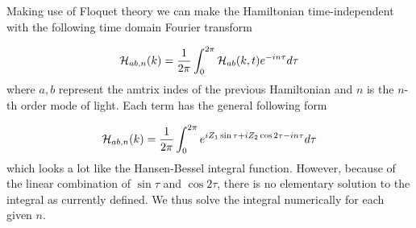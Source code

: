 Making use of Floquet theory we can make the Hamiltonian time-independent with the following time domain Fourier transform

\begin{equation}
  \mathcal{H}_{ab,n}(k) = \dfrac{1}{2\pi} \int_0^{2\pi} \mathcal{H}_{ab}(k,t) e^{-in\tau} d\tau
\end{equation}
where $a,b$ represent the amtrix indes of the previous Hamiltonian and $n$ is the $n$-th order mode of light.
Each term has the general following form

\begin{equation}
  \mathcal{H}_{ab,n}(k) = \dfrac{1}{2\pi} \int_0^{2\pi} e^{i Z_1 \sin\tau + i Z_2 \cos2\tau - in\tau} d\tau
\end{equation}
which looks a lot like the Hansen-Bessel integral function.
However, because of the linear combination of $\sin\tau$ and $\cos 2\tau$, there is no elementary solution to the integral as currently defined.
We thus solve the integral numerically for each given $n$.

